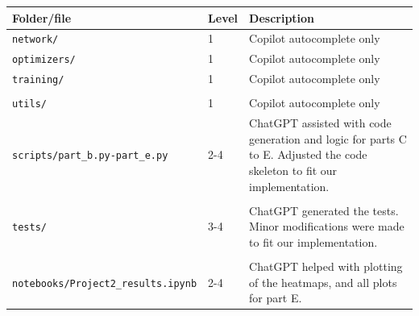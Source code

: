 \documentclass[amssymb,secnumarabic,twocolumn,aps]{revtex4}
\begin{document}
\begin{tabular}{llp{7cm}}
    Folder/file                                & Level & Description                                                                                                             \\ \hline
    \texttt{network/}                          & 1     & Copilot autocomplete only                                                                                               \\
    \texttt{optimizers/}                       & 1     & Copilot autocomplete only                                                                                               \\
    \texttt{training/}                         & 1     & Copilot autocomplete only                                                                                               \\
    \\
    \texttt{utils/}                            & 1     & Copilot autocomplete only                                                                                               \\
    \texttt{scripts/part\_b.py-part\_e.py}     & 2-4   & ChatGPT assisted with code generation and logic for parts C to E. Adjusted the code skeleton to fit our implementation. \\                                                                        \\
    \texttt{tests/}                            & 3-4   & ChatGPT generated the tests. Minor modifications were made to fit our implementation.                                   \\                                                                                                                                                                                               \\
    \texttt{notebooks/Project2\_results.ipynb} & 2-4   & ChatGPT helped with plotting of the heatmaps, and all plots for part E.                                                 \\
\end{tabular}
\end{document}
